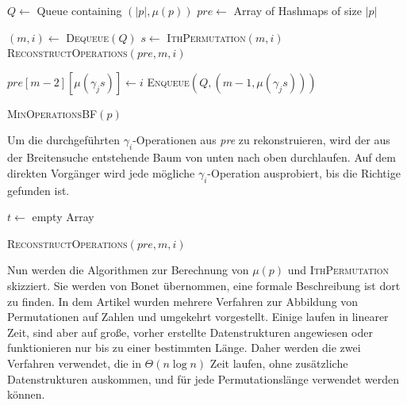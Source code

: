 \documentclass[a4paper, 11pt, ngerman]{article}
\begin{document}
\begin{algorithm}
    $Q \gets$ Queue containing $(|p|, \mu(p))$ \;
    $pre \gets$ Array of Hashmaps of size $|p|$ \;

    {
        $(m, i) \gets $ \textsc{Dequeue}$(Q)$ \;
        $s \gets$ \textsc{IthPermutation}$(m, i)$ \;
        {
            \Return{} \textsc{ReconstructOperations}$(pre, m, i)$ \;
        }

        {
            {
                $pre[m - 2][\mu(\gamma_j s)] \gets i$ \;
                \textsc{Enqueue}$(Q, (m - 1, \mu(\gamma_j s)))$ \;
            }
        }
    }

    \caption{\textsc{MinOperationsBF}$(p)$}
\end{algorithm}

\noindent Um die durchgeführten $\gamma_i$-Operationen aus \emph{pre} zu rekonstruieren, wird der aus der Breitensuche entstehende Baum von unten nach oben durchlaufen. Auf dem direkten Vorgänger wird jede mögliche $\gamma_i$-Operation ausprobiert, bis die Richtige gefunden ist.

\begin{algorithm}
    $t \gets$ empty Array


    \caption{\textsc{ReconstructOperations}$(pre, m, i)$}
\end{algorithm}

\noindent Nun werden die Algorithmen zur Berechnung von $\mu(p)$ und \textsc{IthPermutation} skizziert. Sie werden von Bonet \cite{permutationranking} übernommen, eine formale Beschreibung ist dort zu finden. In dem Artikel wurden mehrere Verfahren zur Abbildung von Permutationen auf Zahlen und umgekehrt vorgestellt. Einige laufen in linearer Zeit, sind aber auf große, vorher erstellte Datenstrukturen angewiesen oder funktionieren nur bis zu einer bestimmten Länge. Daher werden die zwei Verfahren verwendet, die in $\Theta(n \log n)$ Zeit laufen, ohne zusätzliche Datenstrukturen auskommen, und für jede Permutationslänge verwendet werden können.
\end{document}
